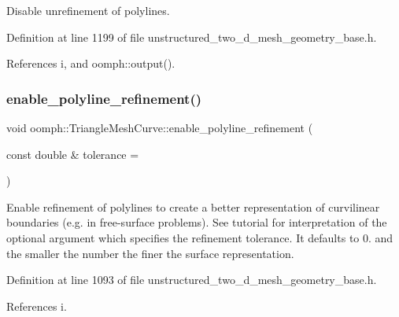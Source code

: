 Disable unrefinement of polylines. 



Definition at line 1199 of file unstructured\+\_\+two\+\_\+d\+\_\+mesh\+\_\+geometry\+\_\+base.\+h.



References i, and oomph\+::output().

\mbox{\label{classoomph_1_1TriangleMeshCurve_aa5ff31ffc3b930d6e342d3f73d37f5c9}} 
\subsubsection{\texorpdfstring{enable\+\_\+polyline\+\_\+refinement()}{enable\_polyline\_refinement()}}
{\footnotesize\ttfamily void oomph\+::\+Triangle\+Mesh\+Curve\+::enable\+\_\+polyline\+\_\+refinement (\begin{DoxyParamCaption}\item[{const double \&}]{tolerance = {} }\end{DoxyParamCaption})\hspace{0.3cm}{\ttfamily [inline]}}



Enable refinement of polylines to create a better representation of curvilinear boundaries (e.\+g. in free-\/surface problems). See tutorial for interpretation of the optional argument which specifies the refinement tolerance. It defaults to 0. and the smaller the number the finer the surface representation. 



Definition at line 1093 of file unstructured\+\_\+two\+\_\+d\+\_\+mesh\+\_\+geometry\+\_\+base.\+h.



References i.

\mbox{\label{classoomph_1_1TriangleMeshCurve_ad43caa6186da5d77772dc43521d2fad5}} 

